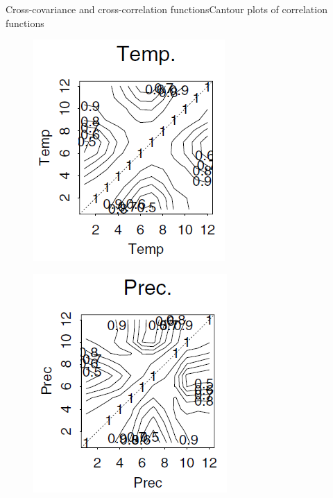 \documentclass{beamer}
\begin{document}
\begin{frame}{Cross-covariance and cross-correlation functions}{Cantour plots of correlation functions}
\begin{multicols}{2}
	\begin{figure}[h] %
		\begin{center}
			\includegraphics[width=0.9\linewidth]{img/10.png}
		\end{center}
		\label{fig:long}
		\label{fig:onecol}
	\end{figure}
	\begin{figure}[h] %
		\begin{center}
			\includegraphics[width=0.9\linewidth]{img/11.png}

\end{center}
\end{figure}
\end{multicols}
\end{frame}
\end{document}

